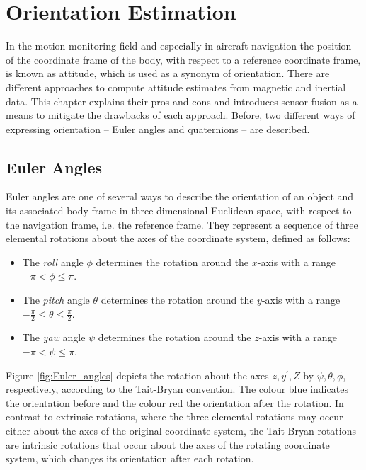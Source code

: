 \chapter{Orientation Estimation}
\label{ch:orientation_estimation}

In the motion monitoring field and especially in aircraft navigation the position of the coordinate frame of the body, with respect to a reference coordinate frame, is known as attitude, which is used as a synonym of orientation. There are different approaches to compute attitude estimates from magnetic and inertial data. This chapter explains their pros and cons and introduces sensor fusion as a means to mitigate the drawbacks of each approach. Before, two different ways of expressing orientation -- Euler angles and quaternions -- are described.

\section{Euler Angles}

Euler angles are one of several ways to describe the orientation of an object and its associated body frame in three-dimensional Euclidean space, with respect to the navigation frame, i.e. the reference frame. They represent a sequence of three elemental rotations about the axes of the coordinate system, defined as follows:

\begin{itemize}
\item The \emph{roll} angle $\phi$ determines the rotation around the $x$-axis with a range $-\pi < \phi \leq \pi$.
\item The \emph{pitch} angle $\theta$ determines the rotation around the $y$-axis with a range $-\frac{\pi}{2} \leq \theta \leq \frac{\pi}{2}$.
\item The \emph{yaw} angle $\psi$ determines the rotation around the $z$-axis with a range $-\pi < \psi \leq \pi$.
\end{itemize}

\noindent
Figure \ref{fig:Euler_angles} depicts the rotation about the axes $z, y^{'}, Z$ by $\psi, \theta, \phi$, respectively, according to the Tait-Bryan convention. The colour blue indicates the orientation before and the colour red the orientation after the rotation. In contrast to extrinsic rotations, where the three elemental rotations may occur either about the axes of the original coordinate system, the Tait-Bryan rotations are intrinsic rotations that occur about the axes of the rotating coordinate system, which changes its orientation after each rotation.

